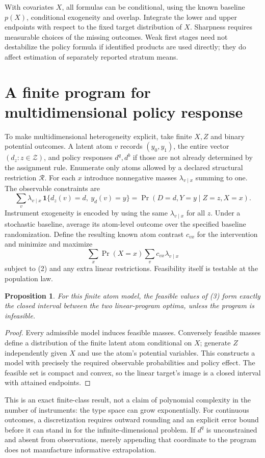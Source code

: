 \documentclass[11pt]{article}
\newtheorem{proposition}[theorem]{Proposition}
\theoremstyle{definition}
\begin{document}
With covariates $X$, all formulas can be conditional, using the known baseline
$p(X)$, conditional exogeneity and overlap. Integrate the lower and upper
endpoints with respect to the fixed target distribution of $X$. Sharpness
requires measurable choices of the missing outcomes. Weak first stages need
not destabilize the policy formula if identified products are used directly;
they do affect estimation of separately reported stratum means.

\section*{A finite program for multidimensional policy response}
To make multidimensional heterogeneity explicit, take finite $X,Z$ and binary
potential outcomes. A latent atom $v$ records $(y_0,y_1)$, the entire vector
$(d_z:z\in\mathcal Z)$, and policy responses $d^q,d^b$ if those are not already
determined by the assignment rule. Enumerate only atoms allowed by a declared
structural restriction $\mathcal R$. For each $x$ introduce nonnegative masses
$\lambda_{v\mid x}$ summing to one. The observable constraints are
\[
 \sum_v\lambda_{v\mid x}\,
 \mathbf1\{d_z(v)=d,\ y_d(v)=y\}
       =\Pr(D=d,Y=y\mid Z=z,X=x).                          \tag{2}
\]
Instrument exogeneity is encoded by using the same $\lambda_{v\mid x}$ for
all $z$. Under a stochastic baseline, average its atom-level outcome over
the specified baseline randomization. Define the resulting known atom contrast
$c_{vx}$ for the intervention and minimize and maximize
\[
 \sum_x\Pr(X=x)\sum_v c_{vx}\lambda_{v\mid x}              \tag{3}
\]
subject to (2) and any extra linear restrictions. Feasibility itself is testable
at the population law.

\begin{proposition}
For this finite atom model, the feasible values of (3) form exactly the closed
interval between the two linear-program optima, unless the program is infeasible.
\end{proposition}
\begin{proof}
Every admissible model induces feasible masses. Conversely feasible masses
define a distribution of the finite latent atom conditional on $X$; generate
$Z$ independently given $X$ and use the atom's potential variables. This
constructs a model with precisely the required observable probabilities and
policy effect. The feasible set is compact and convex, so the linear target's
image is a closed interval with attained endpoints.
\end{proof}
This is an exact finite-class result, not a claim of polynomial complexity in
the number of instruments: the type space can grow exponentially. For continuous
outcomes, a discretization requires outward rounding and an explicit error
bound before it can stand in for the infinite-dimensional problem. If $d^q$
is unconstrained and absent from observations, merely appending that coordinate
to the program does not manufacture informative extrapolation.
\end{document}
